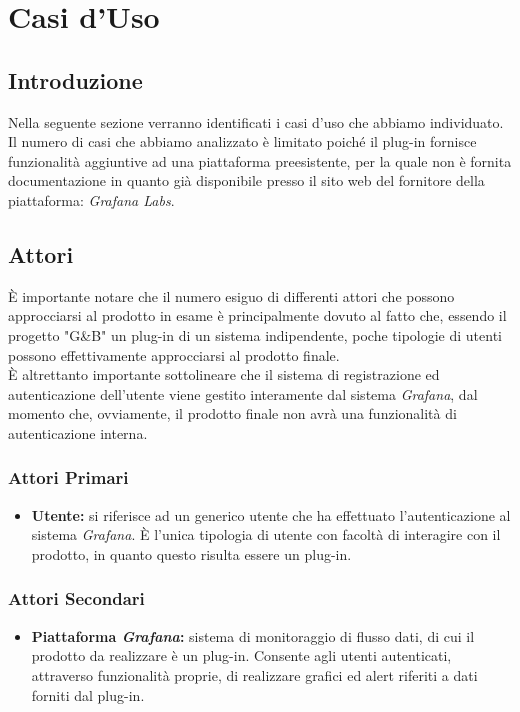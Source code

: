 \section{Casi d'Uso}\label{CasiUso}
\subsection{Introduzione}\label{CasiUso_Introduzione}
Nella seguente sezione verranno identificati i casi d'uso che abbiamo individuato.\\
Il numero di casi che abbiamo analizzato è limitato poiché il plug-in fornisce funzionalità aggiuntive ad una piattaforma preesistente, per la quale non è fornita documentazione in quanto già disponibile presso il sito web del fornitore della piattaforma: \textit{Grafana Labs}.

\subsection{Attori}\label{Attori}
È importante notare che il numero esiguo di differenti attori che possono approcciarsi al prodotto in esame è principalmente dovuto al fatto che, essendo il progetto "G\&B" un plug-in di un sistema indipendente, poche tipologie di utenti possono effettivamente approcciarsi al prodotto finale.\\
È altrettanto importante sottolineare che il sistema di registrazione ed autenticazione dell'utente viene gestito interamente dal sistema \textit{Grafana}, dal momento che, ovviamente, il prodotto finale non avrà una funzionalità di autenticazione interna.

\subsubsection*{Attori Primari}
\begin{itemize}
\item \textbf{Utente:} si riferisce ad un generico utente che ha effettuato l'autenticazione al sistema \textit{Grafana}. È l'unica tipologia di utente con facoltà di interagire con il prodotto, in quanto questo risulta essere un plug-in.
\end{itemize}

\subsubsection*{Attori Secondari}
\begin{itemize}
\item \textbf{Piattaforma \textit{Grafana}:} sistema di monitoraggio di flusso dati, di cui il prodotto da realizzare è un plug-in. Consente agli utenti autenticati, attraverso funzionalità proprie, di realizzare grafici ed alert riferiti a dati forniti dal plug-in.
\end{itemize}

